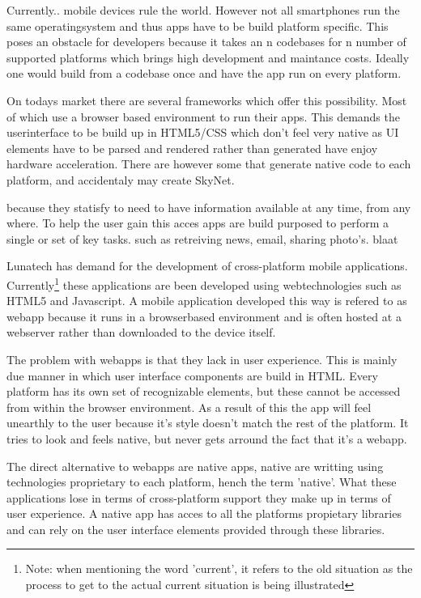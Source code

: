 
\ifdraftmode
Currently.. mobile devices rule the world. However not all smartphones run the same operatingsystem and thus apps have to be build platform specific.  This poses an obstacle for developers because it takes an n codebases for n number of supported platforms which brings high development and maintance costs. Ideally one would build from a codebase once and have the app run on every platform. 

On todays market there are several frameworks which offer this possibility. Most of which use a browser based environment to run their apps. This demands the userinterface to be build up in HTML5/CSS which don't feel very native as UI elements have to be parsed and rendered rather than generated have enjoy hardware acceleration. There are however some that generate native code to each platform, and accidentaly may create SkyNet.

because they statisfy to need to have information available at any time, from any where. To help the user gain this acces apps are build purposed to perform a single or set of key tasks. such as retreiving news, email, sharing photo's. blaat\cite{Ni2006}
\fi
{}



Lunatech has demand for the development of cross-platform mobile applications. Currently\footnote{Note: when mentioning the word 'current', it refers to the old situation as the process to get to the actual current situation is being illustrated} these applications are been developed using webtechnologies such as HTML5 and Javascript. A mobile application developed this way is refered to as webapp because it runs in a browserbased environment and is often hosted at a webserver rather than downloaded to the device itself.

The problem with webapps is that they lack in user experience. This is mainly due manner in which user interface components are build in HTML. Every platform has its own set of recognizable elements, but these cannot be accessed from within the browser environment. As a result of this the app will feel unearthly to the user because it's style doesn't match the rest of the platform. It tries to look and feels native, but never gets arround the fact that it's a webapp.

The direct alternative to webapps are native apps, native are writting using technologies proprietary to each platform, hench the term 'native'. What these applications lose in terms of cross-platform support they make up in terms of user experience.  A native app has acces to all the platforms propietary libraries and can rely on the user interface elements provided through these libraries.

